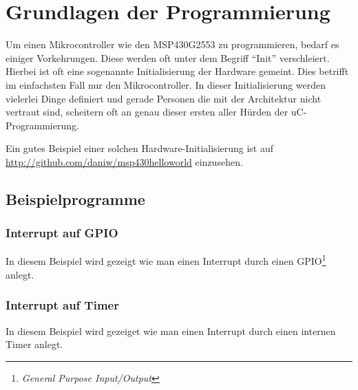 \section{Grundlagen der Programmierung}
Um einen Mikrocontroller wie den MSP430G2553 zu programmieren, bedarf es
einiger Vorkehrungen. Diese werden oft unter dem Begriff ``Init'' 
verschleiert. Hierbei ist oft eine sogenannte Initialisierung der 
Hardware gemeint. Dies betrifft im einfachsten Fall nur den Mikrocontroller.
In dieser Initialisierung werden vielerlei Dinge definiert und gerade Personen
die mit der Architektur nicht vertraut sind, scheitern oft an genau dieser
ersten aller Hürden der uC-Programmierung.

Ein gutes Beispiel einer solchen Hardware-Initialisierung ist 
auf \url{http://github.com/daniw/msp430helloworld} einzusehen.

\begin{comment}
	Im folgenden wird eine solche Initialisierung vorgestellt samt C- 
	und Header-File.

	\subsection{Hardwareinitialisierung}
	
	
\end{comment}

\subsection{Beispielprogramme}

\subsubsection{Interrupt auf GPIO}
In diesem Beispiel wird gezeigt wie man einen Interrupt durch einen
GPIO\footnote{\emph{General Purpose Input/Output}} anlegt.



\subsubsection{Interrupt auf Timer}
In diesem Beispiel wird gezeiget wie man einen Interrupt durch einen internen
Timer anlegt.


